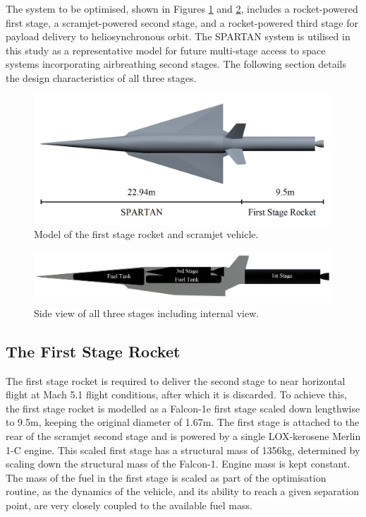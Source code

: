 \documentclass[]{aiaa-tc}
\begin{document}
The system to be optimised, shown in Figures \ref{fig:NoInternal} and \ref{fig:INTERNALS}, includes a rocket-powered first stage, a scramjet-powered second stage, and a rocket-powered third stage for payload delivery to heliosynchronous orbit. The SPARTAN system \cite{Preller2015a,Jazra2013,Preller2017}  is utilised in this study as a representative model for future multi-stage access to space systems incorporating airbreathing second stages. The following section details the design characteristics of all three stages.

\begin{figure}[ht]
	\centering
	\includegraphics[width=.8\linewidth]{NoInternal}
	\caption{Model of the first stage rocket and scramjet vehicle.}
	\label{fig:NoInternal}
\end{figure}


\begin{figure}[ht]
	\centering
	\includegraphics[width=0.8\linewidth]{INTERNALS}
	\caption{Side view of all three stages including internal view.}
	\label{fig:INTERNALS}
\end{figure}

\subsection{The First Stage Rocket}




The first stage rocket is required to deliver the second stage to near horizontal flight at Mach 5.1 flight conditions, after which it is discarded. To achieve this, the first stage rocket is modelled as a Falcon-1e first stage scaled down lengthwise to 9.5m, keeping the original diameter of 1.67m\cite{Vehicle2008}. The first stage is attached to the rear of the scramjet second stage and is powered by a single LOX-kerosene Merlin 1-C engine.  This scaled first stage has a structural mass of 1356kg, determined by scaling down the structural mass of the Falcon-1. Engine mass is kept constant. The mass of the fuel in the first stage is scaled as part of the optimisation routine, as the dynamics of the vehicle, and its ability to reach a given separation point, are very closely coupled to the available fuel mass. 
\end{document}
